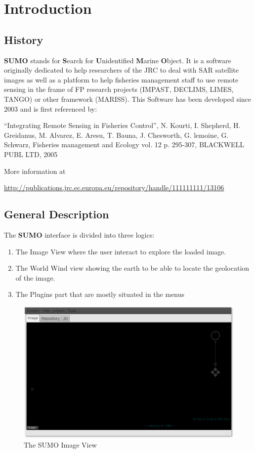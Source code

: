 \documentclass[12pt,a4paper,final]{report}
\begin{document}
\tableofcontents



\chapter{Introduction}
\section{History}
\textbf{SUMO} stands for \textbf{S}earch for \textbf{U}nidentified \textbf{M}arine \textbf{O}bject.
It is a software originally dedicated to help researchers of the JRC to deal with SAR satellite images as well as a platform to help fisheries management staff to use remote sensing in the frame of FP research projects (IMPAST, DECLIMS, LIMES, TANGO) or other framework (MARISS).
This Software has been developed since 2003 and is first referenced by:

``Integrating Remote Sensing in Fisheries Control'', N. Kourti, I. Shepherd, H. Greidanus, M. Alvarez, E. Aresu, T. Bauna, J. Chesworth, G. lemoine, G. Schwarz, Fisheries management and Ecology vol. 12 p. 295-307, BLACKWELL PUBL LTD, 2005

More information at

\url{http://publications.jrc.ec.europa.eu/repository/handle/111111111/13106}

\section{General Description}
The \textbf{SUMO} interface is divided into three logics: 
\begin{enumerate}
 \item The Image View where the user interact to explore the loaded image.
 \item The World Wind view showing the earth to be able to locate the geolocation of the image.
 \item The Plugins part that are mostly situated in the menus
\end{enumerate}


\begin{figure}[H]
 \centering
 \includegraphics[scale=0.45,keepaspectratio=true]{./images/SUMOImageView.png}
 \caption{The SUMO Image View}
\end{figure}
\end{document}
